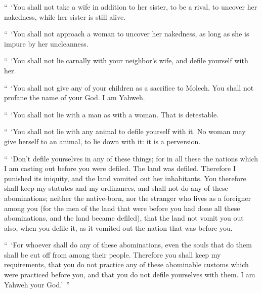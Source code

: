 {\par }{\PP {}“ ‘You shall not take a wife in addition to her sister, to be a rival, to uncover her nakedness, while her sister is still alive.
\par }{\PP {}“ ‘You shall not approach a woman to uncover her nakedness, as long as she is impure by her uncleanness.
\par }{\PP {}“ ‘You shall not lie carnally with your neighbor’s wife, and defile yourself with her.
\par }{\PP {}“ ‘You shall not give any of your children as a sacrifice to Molech. You shall not profane the name of your God. I am Yahweh.
\par }{\PP {}“ ‘You shall not lie with a man as with a woman. That is detestable.
\par }{\PP {}“ ‘You shall not lie with any animal to defile yourself with it. No woman may give herself to an animal, to lie down with it: it is a perversion.
\par }{\PP {}“ ‘Don’t defile yourselves in any of these things; for in all these the nations which I am casting out before you were defiled.
The land was defiled. Therefore I punished its iniquity, and the land vomited out her inhabitants.
You therefore shall keep my statutes and my ordinances, and shall not do any of these abominations; neither the native-born, nor the stranger who lives as a foreigner among you
(for the men of the land that were before you had done all these abominations, and the land became defiled),
that the land not vomit you out also, when you defile it, as it vomited out the nation that was before you.
\par }{\PP {}“ ‘For whoever shall do any of these abominations, even the souls that do them shall be cut off from among their people.
Therefore you shall keep my requirements, that you do not practice any of these abominable customs which were practiced before you, and that you do not defile yourselves with them. I am Yahweh your God.’ ”

}
